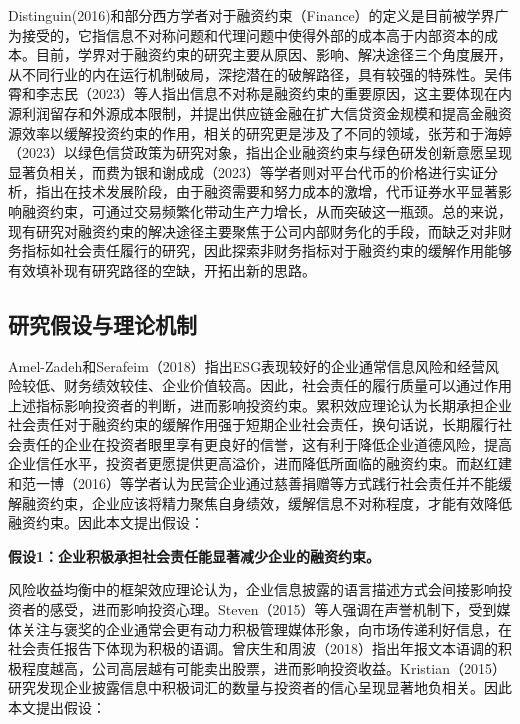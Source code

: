\documentclass[12pt,a4paper]{article}
\begin{document}
Distinguin(2016)和部分西方学者对于融资约束（Finance）的定义是目前被学界广为接受的，它指信息不对称问题和代理问题中使得外部的成本高于内部资本的成本\cite{Distinguin2016}。目前，学界对于融资约束的研究主要从原因、影响、解决途径三个角度展开，从不同行业的内在运行机制破局，深挖潜在的破解路径，具有较强的特殊性。吴伟霄和李志民（2023）等人指出信息不对称是融资约束的重要原因，这主要体现在内源利润留存和外源成本限制，并提出供应链金融在扩大信贷资金规模和提高金融资源效率以缓解投资约束的作用\cite{吴伟霄2023}，相关的研究更是涉及了不同的领域，张芳和于海婷（2023）以绿色信贷政策为研究对象，指出企业融资约束与绿色研发创新意愿呈现显著负相关\cite{张芳2023}，而费为银和谢成成（2023）等学者则对平台代币的价格进行实证分析，指出在技术发展阶段，由于融资需要和努力成本的激增，代币证券水平显著影响融资约束，可通过交易频繁化带动生产力增长，从而突破这一瓶颈\cite{费为银2023}。总的来说，现有研究对融资约束的解决途径主要聚焦于公司内部财务化的手段，而缺乏对非财务指标如社会责任履行的研究，因此探索非财务指标对于融资约束的缓解作用能够有效填补现有研究路径的空缺，开拓出新的思路。

\subsection{研究假设与理论机制}

Amel-Zadeh和Serafeim（2018）指出ESG表现较好的企业通常信息风险和经营风险较低、财务绩效较佳、企业价值较高\cite{Amel-Zadeh2018}。因此，社会责任的履行质量可以通过作用上述指标影响投资者的判断，进而影响投资约束。累积效应理论认为长期承担企业社会责任对于融资约束的缓解作用强于短期企业社会责任\cite{花拥军2020}，换句话说，长期履行社会责任的企业在投资者眼里享有更良好的信誉，这有利于降低企业道德风险，提高企业信任水平，投资者更愿提供更高溢价\cite{阮刚铭2019}，进而降低所面临的融资约束。而赵红建和范一博（2016）等学者认为民营企业通过慈善捐赠等方式践行社会责任并不能缓解融资约束，企业应该将精力聚焦自身绩效，缓解信息不对称程度，才能有效降低融资约束\cite{赵红建2016}。因此本文提出假设：

\textbf{假设1：企业积极承担社会责任能显著减少企业的融资约束。}

风险收益均衡中的框架效应理论认为，企业信息披露的语言描述方式会间接影响投资者的感受，进而影响投资心理。Steven（2015）等人强调在声誉机制下，受到媒体关注与褒奖的企业通常会更有动力积极管理媒体形象，向市场传递利好信息\cite{Blankespoor2020}，在社会责任报告下体现为积极的语调。曾庆生和周波（2018）指出年报文本语调的积极程度越高，公司高层越有可能卖出股票，进而影响投资收益\cite{曾庆生2018}。Kristian（2015）研究发现企业披露信息中积极词汇的数量与投资者的信心呈现显著地负相关\cite{Kristian2015}。因此本文提出假设：
\end{document}

